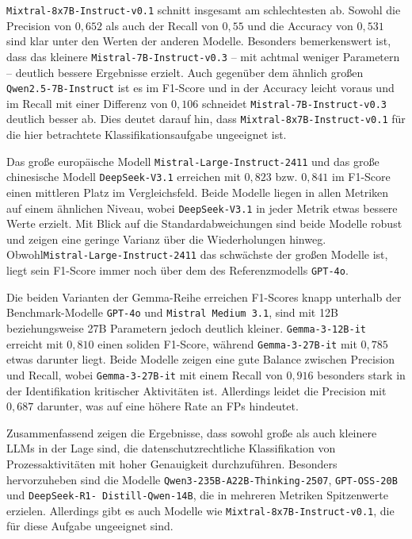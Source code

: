 \texttt{Mixtral-8x7B-Instruct-v0.1} schnitt insgesamt am schlechtesten ab. Sowohl die Precision von $0{,}652$ als auch der Recall von $0{,}55$ und die Accuracy von $0{,}531$ sind klar unter den Werten der anderen Modelle. Besonders bemerkenswert ist, dass das kleinere \texttt{Mistral-7B-Instruct-v0.3} – mit achtmal weniger Parametern – deutlich bessere Ergebnisse erzielt. Auch gegenüber dem ähnlich großen \texttt{Qwen2.5-7B-Instruct} ist es im F1-Score und in der Accuracy leicht voraus und im Recall mit einer Differenz von $0{,}106$ schneidet \texttt{Mistral-7B-Instruct-v0.3} deutlich besser ab. Dies deutet darauf hin, dass \texttt{Mixtral-8x7B-Instruct-v0.1} für die hier betrachtete Klassifikationsaufgabe ungeeignet ist.

Das große europäische Modell \texttt{Mistral-Large-Instruct-2411} und das große chinesische Modell \texttt{DeepSeek-V3.1} erreichen mit $0{,}823$ bzw. $0{,}841$ im F1-Score einen mittleren Platz im Vergleichsfeld. Beide Modelle liegen in allen Metriken auf einem ähnlichen Niveau, wobei \texttt{DeepSeek-V3.1} in jeder Metrik etwas bessere Werte erzielt. Mit Blick auf die Standardabweichungen sind beide Modelle robust und zeigen eine geringe Varianz über die Wiederholungen hinweg. Obwohl\linebreak\texttt{Mistral-Large-Instruct-2411} das schwächste der großen Modelle ist, liegt sein F1-Score immer noch über dem des Referenzmodells \texttt{GPT-4o}.

Die beiden Varianten der Gemma-Reihe erreichen F1-Scores knapp unterhalb der Benchmark-Modelle \texttt{GPT-4o} und \texttt{Mistral Medium 3.1}, sind mit 12B beziehungsweise 27B Parametern jedoch deutlich kleiner. \texttt{Gemma-3-12B-it} erreicht mit $0{,}810$ einen soliden F1-Score, während \texttt{Gemma-3-27B-it} mit $0{,}785$ etwas darunter liegt. Beide Modelle zeigen eine gute Balance zwischen Precision und Recall, wobei \texttt{Gemma-3-27B-it} mit einem Recall von $0{,}916$ besonders stark in der Identifikation kritischer Aktivitäten ist. Allerdings leidet die Precision mit $0{,}687$ darunter, was auf eine höhere Rate an \acp{FP} hindeutet.

Zusammenfassend zeigen die Ergebnisse, dass sowohl große als auch kleinere \acp{LLM} in der Lage sind, die datenschutzrechtliche Klassifikation von Prozessaktivitäten mit hoher Genauigkeit durchzuführen. Besonders hervorzuheben sind die Modelle \texttt{Qwen3-235B-A22B-Thinking-2507}, \texttt{GPT-OSS-20B} und \texttt{DeepSeek-R1-\linebreak~Distill-Qwen-14B}, die in mehreren Metriken Spitzenwerte erzielen. Allerdings gibt es auch Modelle wie \texttt{Mixtral-8x7B-Instruct-v0.1}, die für diese Aufgabe ungeeignet sind.